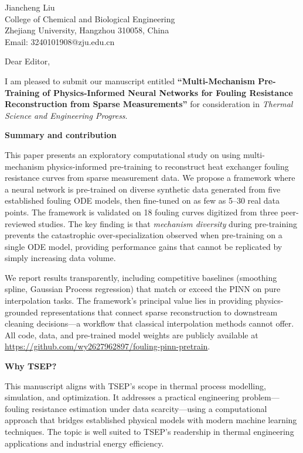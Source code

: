 \documentclass{article}
\begin{document}
\begin{flushright}
Jiancheng Liu\\
College of Chemical and Biological Engineering\\
Zhejiang University, Hangzhou 310058, China\\
Email: 3240101908@zju.edu.cn
\end{flushright}

\vspace{1cm}

\noindent Dear Editor,

I am pleased to submit our manuscript entitled \textbf{``Multi-Mechanism Pre-Training of Physics-Informed Neural Networks for Fouling Resistance Reconstruction from Sparse Measurements''} for consideration in \textit{Thermal Science and Engineering Progress}.

\vspace{0.5cm}

\noindent \textbf{Summary and contribution}

This paper presents an exploratory computational study on using multi-mechanism physics-informed pre-training to reconstruct heat exchanger fouling resistance curves from sparse measurement data. We propose a framework where a neural network is pre-trained on diverse synthetic data generated from five established fouling ODE models, then fine-tuned on as few as 5--30 real data points. The framework is validated on 18 fouling curves digitized from three peer-reviewed studies. The key finding is that \textit{mechanism diversity} during pre-training prevents the catastrophic over-specialization observed when pre-training on a single ODE model, providing performance gains that cannot be replicated by simply increasing data volume.

We report results transparently, including competitive baselines (smoothing spline, Gaussian Process regression) that match or exceed the PINN on pure interpolation tasks. The framework's principal value lies in providing physics-grounded representations that connect sparse reconstruction to downstream cleaning decisions---a workflow that classical interpolation methods cannot offer. All code, data, and pre-trained model weights are publicly available at \url{https://github.com/wy2627962897/fouling-pinn-pretrain}.

\vspace{0.5cm}

\noindent \textbf{Why TSEP?}

This manuscript aligns with TSEP's scope in thermal process modelling, simulation, and optimization. It addresses a practical engineering problem---fouling resistance estimation under data scarcity---using a computational approach that bridges established physical models with modern machine learning techniques. The topic is well suited to TSEP's readership in thermal engineering applications and industrial energy efficiency.
\end{document}
